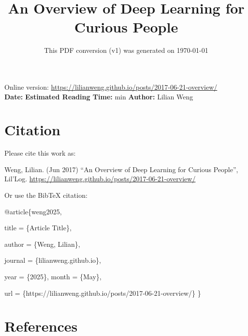 \documentclass[12pt]{article}
\title{An Overview of Deep Learning for Curious People}
\date{This PDF conversion (v1) was generated on \today\footnotemark}
\begin{document}
\maketitle
\begin{center}
    Online version: \url{https://lilianweng.github.io/posts/2017-06-21-overview/} \\
    \textbf{Date:} \quad
    \textbf{Estimated Reading Time:}  min \quad
    \textbf{Author:} Lilian Weng
\end{center}




\newpage
\tableofcontents
\newpage
\vspace{1em}
\n\n\n\section{Citation}
Please cite this work as:

\begin{tcolorbox}[colback=black!5!white, colframe=black!80!white, boxrule=0.5pt, arc=2mm, left=1mm, right=1mm, top=1mm, bottom=1mm]
  Weng, Lilian. (Jun 2017) ``An Overview of Deep Learning for Curious People'', Lil'Log. \url{https://lilianweng.github.io/posts/2017-06-21-overview/}
  \end{tcolorbox}

Or use the BibTeX citation:

\begin{tcolorbox}[
    colback=black!5!white,
    colframe=black!80!white,
    boxrule=0.5pt,
    arc=2mm,
    left=1mm,
    right=1mm,
    top=1mm,
    bottom=1mm,
    listing only,
    listing options={
      basicstyle=\ttfamily\footnotesize,
      breaklines=true,
      literate={\{}{{\char`\{}}1 {\}}{{\char`\}}}1
    }
  ]
  @article\{weng2025,

    title   = \{Article Title\},

    author  = \{Weng, Lilian\},

    journal = \{lilianweng.github.io\},

    year    = \{2025\},
    month   = \{May\},

    url     = \{https://lilianweng.github.io/posts/2017-06-21-overview/\}\n
  \}
  \end{tcolorbox}

\newpage
\section{References}

\n
\end{document}
